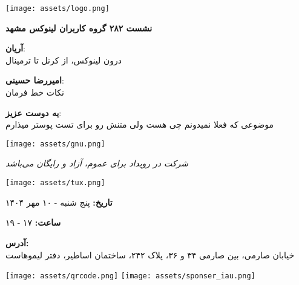 \documentclass[a4paper]{article}
\begin{document}
\begin{minipage}{0.2\textwidth}
  \texttt{[image: assets/logo.png]}
\end{minipage}
\hfill
\begin{minipage}{0.8\textwidth}
  \raggedleft
  {\Huge\textbf{نشست ۲۸۲ گروه کاربران لینوکس مشهد}}\\
\end{minipage}

\vspace{1cm}


\begin{minipage}[t]{0.5\textwidth}
	\huge
	\raggedleft

	\textbf{آریان}:\\
	درون لینوکس، از کرنل تا ترمینال
	\vspace{0.3cm}

	\textbf{امیررضا حسینی}:\\
	نکات خط فرمان
	\vspace{0.3cm}

	\textbf{یه دوست عزیز}:\\
	موضوعی که فعلا نمیدونم چی هست ولی متنش رو برای تست پوستر میذارم
\end{minipage}
\hfill
\begin{minipage}[t]{0.5\textwidth}
\centering
\vspace{\fill}
\texttt{[image: assets/gnu.png]}
\vspace{\fill}
\end{minipage}

\vspace{1.5cm}

\begin{minipage}{\textwidth}
\centering
\Huge
\textit{شرکت در رویداد برای عموم، آزاد و رایگان می‌باشد}
\end{minipage}

\vspace{1.5cm}

\begin{minipage}[t]{0.47\textwidth}
\centering
\vspace{\fill}
\texttt{[image: assets/tux.png]}
\vspace{\fill}
\end{minipage}
\hfill
\begin{minipage}[t]{0.5\textwidth}
	\huge
	\raggedleft

	\textbf{تاریخ:} پنج شنبه - ۱۰ مهر ۱۴۰۴
	\vspace{0.3cm}

	\textbf{ساعت:} ۱۷ - ۱۹
	\vspace{0.3cm}

	\textbf{آدرس:}\\
	خیابان صارمی، بین صارمی ۳۴ و ۳۶، پلاک ۲۴۲، ساختمان اساطیر، دفتر لیموهاست
	\vspace{0.3cm}

	\texttt{[image: assets/qrcode.png]}
	\vspace{\fill}
	\texttt{[image: assets/sponser\_iau.png]}
\end{minipage}
\end{document}
